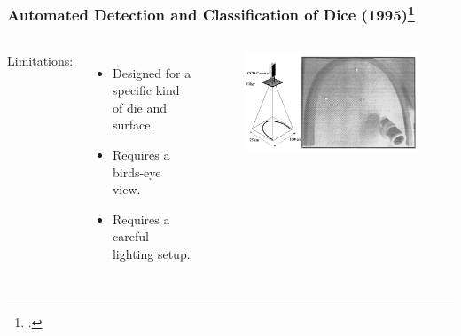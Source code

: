 \documentclass{beamer}
\begin{document}
\begin{frame}
\frametitle{Automated Detection and Classification of Dice (1995)\footcite{Correia1995}}



\vspace{\baselineskip}

\begin{columns}


Limitations:
\begin{itemize}
	\item Designed for a specific kind of die and surface.
	\item Requires a birds-eye view.
	\item Requires a careful lighting setup.
\end{itemize}


\begin{figure}
	\centering
	\includegraphics[width=\textwidth]{prior_1a}
\end{figure}

\end{columns}
	
\end{frame}
\end{document}
